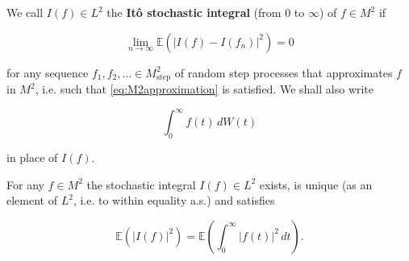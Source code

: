 \begin{Definition}
\label{def:7.4}
We call $I(f) \in L^2$ the \textbf{Itô stochastic integral} (from $0$ to $\infty$) of $f \in M^2$ if

\begin{equation}
\lim_{n \to \infty} \mathbb{E}\left(|I(f) - I(f_n)|^2\right) = 0
\label{eq:ItoIntegralLimit}
\end{equation}

for any sequence $f_1, f_2, \ldots \in M_{\mathrm{step}}^2$ of random step processes that approximates $f$ in $M^2$, i.e. such that \eqref{eq:M2approximation} is satisfied. We shall also write

\begin{equation}
\int_0^\infty f(t) \, dW(t)
\end{equation}

in place of $I(f)$.
\end{Definition}

\begin{Proposition}
\label{prop:7.2}
For any $f \in M^2$ the stochastic integral $I(f) \in L^2$ exists, is unique (as an element of $L^2$, i.e. to within equality a.s.) and satisfies

\begin{equation}
\mathbb{E}\left(|I(f)|^2\right) = \mathbb{E}\left(\int_0^\infty |f(t)|^2 \, dt\right).
\label{eq:ItoIsometry}
\end{equation}
\end{Proposition}

